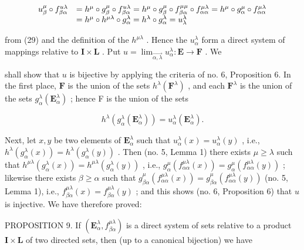 \[
\begin{array}{r l} u _ {\beta} ^ {\mu} \circ f _ {\beta \alpha} ^ {u \lambda} & = h ^ {\mu} \circ g _ {\beta} ^ {\mu} \circ f _ {\beta \alpha} ^ {u \lambda} = h ^ {\mu} \circ g _ {\beta} ^ {\mu} \circ f _ {\beta \alpha} ^ {\mu \mu} \circ f _ {\alpha \alpha} ^ {\mu \lambda} = h ^ {\mu} \circ g _ {\alpha} ^ {\mu} \circ f _ {\alpha \alpha} ^ {\mu \lambda} \\ & = h ^ {\mu} \circ h ^ {\mu \lambda} \circ g _ {\alpha} ^ {\lambda} = h ^ {\lambda} \circ g _ {\alpha} ^ {\lambda} = u _ {\lambda} ^ {\lambda} \end{array}
\]

from (29) and the definition of the \(h^{\mu \lambda}\) . Hence the \(u_{\alpha}^{\lambda}\) form a direct system of mappings relative to \(\mathbf{I} \times \mathbf{L}\) . Put \(u = \lim_{\overrightarrow{\alpha, \lambda}} u_{\alpha}^{\lambda}: \mathbf{E} \to \mathbf{F}\) . We

shall show that \(u\) is bijective by applying the criteria of no. 6, Proposition 6. In the first place, \(\mathbf{F}\) is the union of the sets \(h^{\lambda}(\mathbf{F}^{\lambda})\) , and each \(\mathbf{F}^{\lambda}\) is the union of the sets \(g_{\alpha}^{\lambda}(\mathbf{E}_{\alpha}^{\lambda})\) ; hence F is the union of the sets

\[
h ^ {\lambda} (g _ {\alpha} ^ {\lambda} (\mathbf {E} _ {\alpha} ^ {\lambda})) = u _ {\alpha} ^ {\lambda} (\mathbf {E} _ {\alpha} ^ {\lambda}).
\]

Next, let \(x, y\) be two elements of \(\mathbf{E}_{\alpha}^{\lambda}\) such that \(u_{\alpha}^{\lambda}(x) = u_{\alpha}^{\lambda}(y)\) , i.e., \(h^{\lambda}(g_{\alpha}^{\lambda}(x)) = h^{\lambda}(g_{\alpha}^{\lambda}(y))\) . Then (no. 5, Lemma 1) there exists \(\mu \geqslant \lambda\) such that \(h^{\mu \lambda}(g_{\alpha}^{\lambda}(x)) = h^{\mu \lambda}(g_{\alpha}^{\lambda}(y))\) , i.e., \(g_{\alpha}^{\mu}(f_{\alpha \alpha}^{\mu \lambda}(x)) = g_{\alpha}^{\mu}(f_{\alpha \alpha}^{\mu \lambda}(y))\) ; likewise there exists \(\beta \geqslant \alpha\) such that \(g_{\beta \alpha}^{\mu}(f_{\alpha \alpha}^{\mu \lambda}(x)) = g_{\beta \alpha}^{\mu}(f_{\alpha \alpha}^{\mu \lambda}(y))\) (no. 5, Lemma 1), i.e., \(f_{\beta \alpha}^{\mu \lambda}(x) = f_{\beta \alpha}^{\mu \lambda}(y)\) ; and this shows (no. 6, Proposition 6) that \(u\) is injective. We have therefore proved:

PROPOSITION 9. If \((\mathbf{E}_{\alpha}^{\lambda}, f_{\beta \alpha}^{\mu \lambda})\) is a direct system of sets relative to a product \(\mathbf{I} \times \mathbf{L}\) of two directed sets, then (up to a canonical bijection) we have

